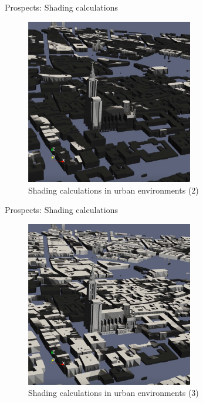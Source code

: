 \documentclass[10pt]{beamer}
\begin{document}
\begin{frame}{Prospects: Shading calculations}
  \begin{figure}
      \centering
      \includegraphics[width=0.65\textwidth]{images/shading-2.png}
      \caption{Shading calculations in urban environments (2)}
  \end{figure}
\end{frame}

\begin{frame}{Prospects: Shading calculations}
  \begin{figure}
      \centering
      \includegraphics[width=0.65\textwidth]{images/shading-3.png}
      \caption{Shading calculations in urban environments (3)}
  \end{figure}
\end{frame}
\end{document}
